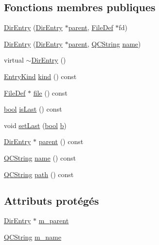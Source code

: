 \subsection*{Fonctions membres publiques}
\begin{DoxyCompactItemize}
\item 
\hyperlink{class_dir_entry_a04dfc1cc4766297488f75f58ea999ea3}{Dir\+Entry} (\hyperlink{class_dir_entry}{Dir\+Entry} $\ast$\hyperlink{class_dir_entry_a4bc3262d0c9a5aa23a6b6eba8414a05a}{parent}, \hyperlink{class_file_def}{File\+Def} $\ast$fd)
\item 
\hyperlink{class_dir_entry_aca2fc76af0b968b01bc465bf22da4f19}{Dir\+Entry} (\hyperlink{class_dir_entry}{Dir\+Entry} $\ast$\hyperlink{class_dir_entry_a4bc3262d0c9a5aa23a6b6eba8414a05a}{parent}, \hyperlink{class_q_c_string}{Q\+C\+String} \hyperlink{class_dir_entry_a4b1ef667119bd83d109f4cefa20ef4ea}{name})
\item 
virtual \hyperlink{class_dir_entry_a97026a1420cd2421b2ab3426848058f7}{$\sim$\+Dir\+Entry} ()
\item 
\hyperlink{class_dir_entry_a1edafe219ba585326221f2fbe66afaf0}{Entry\+Kind} \hyperlink{class_dir_entry_aca308a26563711a43c6a1f2c10c31ef7}{kind} () const 
\item 
\hyperlink{class_file_def}{File\+Def} $\ast$ \hyperlink{class_dir_entry_a6ba7c0ec1ad833359de3c3877a1d5265}{file} () const 
\item 
\hyperlink{qglobal_8h_a1062901a7428fdd9c7f180f5e01ea056}{bool} \hyperlink{class_dir_entry_ab3516d39a84a7f9b99b5491dfdd31802}{is\+Last} () const 
\item 
void \hyperlink{class_dir_entry_afe7c7ba2399a45fff693a00c8390510f}{set\+Last} (\hyperlink{qglobal_8h_a1062901a7428fdd9c7f180f5e01ea056}{bool} \hyperlink{060__command__switch_8tcl_a68bdb74c144118d936931c46f75d4b3e}{b})
\item 
\hyperlink{class_dir_entry}{Dir\+Entry} $\ast$ \hyperlink{class_dir_entry_a4bc3262d0c9a5aa23a6b6eba8414a05a}{parent} () const 
\item 
\hyperlink{class_q_c_string}{Q\+C\+String} \hyperlink{class_dir_entry_a4b1ef667119bd83d109f4cefa20ef4ea}{name} () const 
\item 
\hyperlink{class_q_c_string}{Q\+C\+String} \hyperlink{class_dir_entry_a439b9effb2ba43f6819ab037e23ed406}{path} () const 
\end{DoxyCompactItemize}
\subsection*{Attributs protégés}
\begin{DoxyCompactItemize}
\item 
\hyperlink{class_dir_entry}{Dir\+Entry} $\ast$ \hyperlink{class_dir_entry_ac43bb4a66667c2dc67c40152b6c17975}{m\+\_\+parent}
\item 
\hyperlink{class_q_c_string}{Q\+C\+String} \hyperlink{class_dir_entry_a6d177d497073ab12cbc88611027f62e9}{m\+\_\+name}
\end{DoxyCompactItemize}


